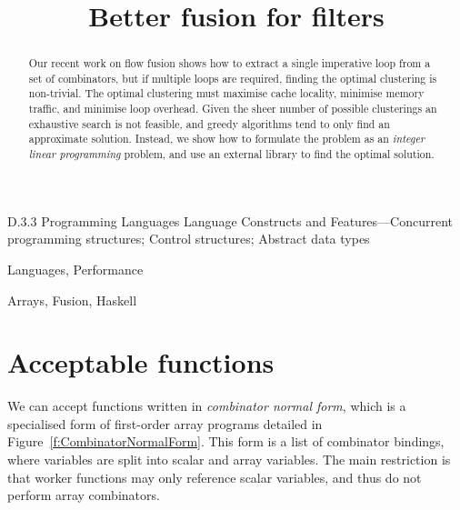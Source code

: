 \documentclass[preprint]{sigplanconf}
\begin{document}
\title{Better fusion for filters}


\maketitle
\makeatactive

\begin{abstract}
Our recent work on flow fusion shows how to extract a single imperative loop from a set of combinators, but if multiple loops are required, finding the optimal clustering is non-trivial.
The optimal clustering must maximise cache locality, minimise memory traffic, and minimise loop overhead.
Given the sheer number of possible clusterings an exhaustive search is not feasible, and greedy algorithms tend to only find an approximate solution.
Instead, we show how to formulate the problem as an \emph{integer linear programming} problem, and use an external library to find the optimal solution.
\end{abstract}

\category
	{D.3.3}
	{Programming Languages}
	{Language Constructs and Features---Concurrent programming structures; Control structures; Abstract data types}

\terms
	Languages, Performance

\keywords
	Arrays, Fusion, Haskell




\section{Acceptable functions}
We can accept functions written in \emph{combinator normal form}, which is a specialised form of first-order array programs detailed in Figure~\ref{f:CombinatorNormalForm}.
This form is a list of combinator bindings, where variables are split into scalar and array variables.
The main restriction is that worker functions may only reference scalar variables, and thus do not perform array combinators.
\end{document}
